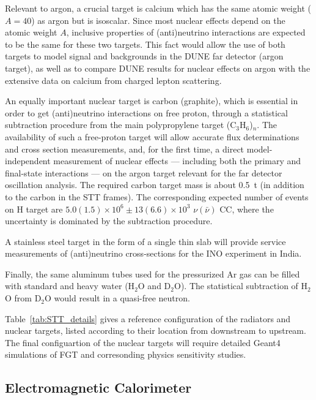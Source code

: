 Relevant to argon, a crucial target is calcium which has the same
atomic weight ($A=40$) as argon but is isoscalar.  Since most nuclear
effects depend on the atomic weight $A$, inclusive properties of
(anti)neutrino interactions are expected to be the same for these two
targets.  This fact would allow the use of both targets to model
signal and backgrounds in the DUNE far detector (argon target), as
well as to compare DUNE results for nuclear effects on argon with the
extensive data on calcium from charged lepton scattering.


An equally important nuclear target is carbon (graphite), which is
essential in order to get (anti)neutrino interactions on free proton,
through a statistical subtraction procedure from the main
polypropylene target (C$_3$H$_6$)$_n$.  The availability of such a
free-proton target will allow accurate flux determinations and cross
section measurements, and, for the first time, a direct
model-independent measurement of nuclear effects --- including both
the primary and final-state interactions --- on the argon target
relevant for the far detector oscillation analysis. The required
carbon target mass is about 0.5~t (in addition to the carbon in the
STT frames). The corresponding expected number of events on H target
are $5.0 (1.5) \times 10^6 \pm 13(6.6) \times 10^3$ $\nu(\bar \nu)$
CC, where the uncertainty is dominated by the subtraction procedure.

A stainless steel target in the form of a single thin slab will
provide service measurements of (anti)neutrino cross-sections for the
INO experiment in India.

Finally, the same aluminum tubes used for the pressurized Ar gas can
be filled with standard and heavy water (H$_2$O and D$_2$O). The
statistical subtraction of H$_2$O from D$_2$O would result in a
quasi-free neutron.

Table~\ref{tab:STT_details} gives a reference configuration of the
radiators and nuclear targets, listed according to their location from
downstream to upstream.  The final configuartion of the nuclear
targets will require detailed Geant4 simulations of FGT and
corresonding physics sensitivity studies.


\subsection{Electromagnetic Calorimeter}
\label{cdrsec:detectors-nd-ref-fgt-ecal}

